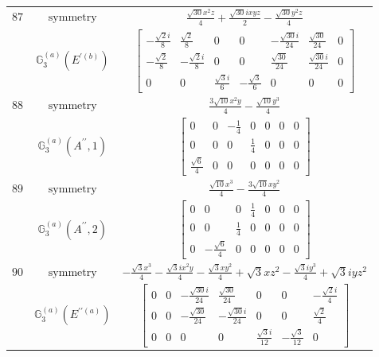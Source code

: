 \documentclass[fleqn,8pt,landscape]{jsarticle}
\begin{document}
\begin{longtable}{ccc}
$ 87 $ & $ \text{symmetry} $ & $ \frac{\sqrt{30} x^{2} z}{4} + \frac{\sqrt{30} i x y z}{2} - \frac{\sqrt{30} y^{2} z}{4} $ \\
$  $ & $ \mathbb{G}_{3}^{(a)}(E^{\prime(b)}) $ & $ \begin{bmatrix} - \frac{\sqrt{2} i}{8} & \frac{\sqrt{2}}{8} & 0 & 0 & - \frac{\sqrt{30} i}{24} & \frac{\sqrt{30}}{24} & 0 \\ - \frac{\sqrt{2}}{8} & - \frac{\sqrt{2} i}{8} & 0 & 0 & \frac{\sqrt{30}}{24} & \frac{\sqrt{30} i}{24} & 0 \\ 0 & 0 & \frac{\sqrt{3} i}{6} & - \frac{\sqrt{3}}{6} & 0 & 0 & 0 \end{bmatrix} $ \\ \hline
$ 88 $ & $ \text{symmetry} $ & $ \frac{3 \sqrt{10} x^{2} y}{4} - \frac{\sqrt{10} y^{3}}{4} $ \\
$  $ & $ \mathbb{G}_{3}^{(a)}(A^{\prime\prime},1) $ & $ \begin{bmatrix} 0 & 0 & - \frac{1}{4} & 0 & 0 & 0 & 0 \\ 0 & 0 & 0 & \frac{1}{4} & 0 & 0 & 0 \\ \frac{\sqrt{6}}{4} & 0 & 0 & 0 & 0 & 0 & 0 \end{bmatrix} $ \\ \hline
$ 89 $ & $ \text{symmetry} $ & $ \frac{\sqrt{10} x^{3}}{4} - \frac{3 \sqrt{10} x y^{2}}{4} $ \\
$  $ & $ \mathbb{G}_{3}^{(a)}(A^{\prime\prime},2) $ & $ \begin{bmatrix} 0 & 0 & 0 & \frac{1}{4} & 0 & 0 & 0 \\ 0 & 0 & \frac{1}{4} & 0 & 0 & 0 & 0 \\ 0 & - \frac{\sqrt{6}}{4} & 0 & 0 & 0 & 0 & 0 \end{bmatrix} $ \\ \hline
$ 90 $ & $ \text{symmetry} $ & $ - \frac{\sqrt{3} x^{3}}{4} - \frac{\sqrt{3} i x^{2} y}{4} - \frac{\sqrt{3} x y^{2}}{4} + \sqrt{3} x z^{2} - \frac{\sqrt{3} i y^{3}}{4} + \sqrt{3} i y z^{2} $ \\
$  $ & $ \mathbb{G}_{3}^{(a)}(E^{\prime\prime(a)}) $ & $ \begin{bmatrix} 0 & 0 & - \frac{\sqrt{30} i}{24} & \frac{\sqrt{30}}{24} & 0 & 0 & - \frac{\sqrt{2} i}{4} \\ 0 & 0 & - \frac{\sqrt{30}}{24} & - \frac{\sqrt{30} i}{24} & 0 & 0 & \frac{\sqrt{2}}{4} \\ 0 & 0 & 0 & 0 & \frac{\sqrt{3} i}{12} & - \frac{\sqrt{3}}{12} & 0 \end{bmatrix} $ \\ \hline

\end{longtable}
\end{document}
